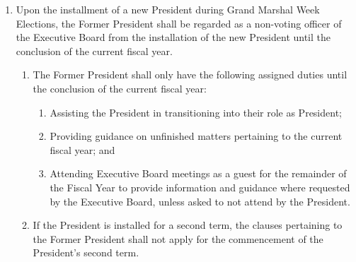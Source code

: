 \begin{enumerate}
  \begin{enumerate}
  \item All non-voting officers of the Executive Board shall serve at the leisure of the President of the Union.
  \item Any non-voting officer given comparable responsibilities to a Representative, such as representing assigned clubs, shall require the majority confirmation of the Student Senate before such duties can be conferred.
  \end{enumerate}
\item Upon the installment of a new President during Grand Marshal Week Elections, the Former President shall be regarded as a non-voting officer of the Executive Board from the installation of the new President until the conclusion of the current fiscal year.
  \begin{enumerate}
  \item The Former President shall only have the following assigned duties until the conclusion of the current fiscal year:
    \begin{enumerate}
    \item Assisting the President in transitioning into their role as President;
    \item Providing guidance on unfinished matters pertaining to the current fiscal year; and
    \item Attending Executive Board meetings as a guest for the remainder of the Fiscal Year to provide information and guidance where requested by the Executive Board, unless asked to not attend by the President.
    \end{enumerate}
  \item If the President is installed for a second term, the clauses pertaining to the Former President shall not apply for the commencement of the President’s second term.
  \end{enumerate}
\end{enumerate}


